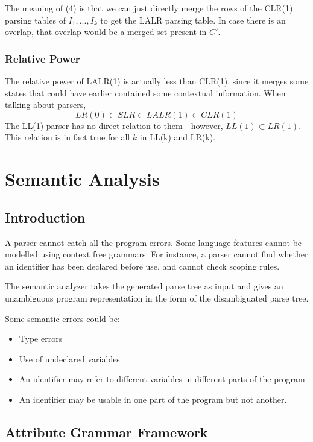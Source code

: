 \documentclass[12pt,letterpaper]{book}
\theoremstyle{definition}
\begin{document}
The meaning of (4) is that we can just directly merge the rows of the CLR(1) parsing tables of $I_1,...,I_k$ to get the LALR parsing table. In case there is an overlap, that overlap would be a merged set present in $C'$.

\subsection{Relative Power}

The relative power of LALR(1) is actually less than CLR(1), since it merges some states that could have earlier contained some contextual information. When talking about parsers,
\[LR(0) \subset SLR \subset LALR(1) \subset CLR(1)\]
The LL(1) parser has no direct relation to them - however, $LL(1) \subset LR(1)$. This relation is in fact true for all $k$ in LL(k) and LR(k).

\chapter{Semantic Analysis}

\section{Introduction}

A parser cannot catch all the program errors. Some language features cannot be modelled using context free grammars. For instance, a parser cannot find whether an identifier has been declared before use, and cannot check scoping rules.

The semantic analyzer takes the generated parse tree as input and gives an unambiguous program representation in the form of the disambiguated parse tree.

Some semantic errors could be:

\begin{itemize}
  \item Type errors
  \item Use of undeclared variables
  \item An identifier may refer to different variables in different parts of the program
  \item An identifier may be usable in one part of the program but not another.
\end{itemize}

\section{Attribute Grammar Framework}
\end{document}
